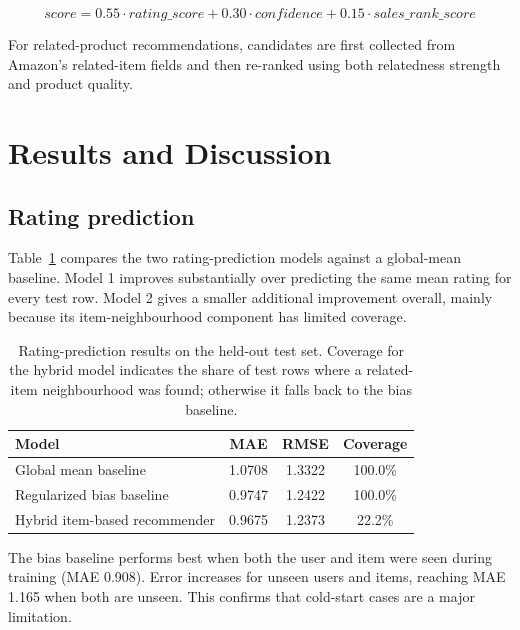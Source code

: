 \documentclass[11pt,a4paper]{article}
\begin{document}
\[
score = 0.55 \cdot rating\_score + 0.30 \cdot confidence + 0.15 \cdot sales\_rank\_score
\]

For related-product recommendations, candidates are first collected from Amazon's related-item fields and then re-ranked using both relatedness strength and product quality.
 
\section{Results and Discussion}
\label{sec:results}
 
\subsection{Rating prediction}

Table~\ref{tab:model_results} compares the two rating-prediction models against a global-mean baseline. Model 1 improves substantially over predicting the same mean rating for every test row. Model 2 gives a smaller additional improvement overall, mainly because its item-neighbourhood component has limited coverage.

\begin{table}[h]
\centering
\small
\begin{tabular}{@{}lccc@{}}
\toprule
\textbf{Model} & \textbf{MAE} & \textbf{RMSE} & \textbf{Coverage} \\
\midrule
Global mean baseline & 1.0708 & 1.3322 & 100.0\% \\
Regularized bias baseline & 0.9747 & 1.2422 & 100.0\% \\
Hybrid item-based recommender & 0.9675 & 1.2373 & 22.2\% \\
\bottomrule
\end{tabular}
\caption{Rating-prediction results on the held-out test set. Coverage for the hybrid model indicates the share of test rows where a related-item neighbourhood was found; otherwise it falls back to the bias baseline.}
\label{tab:model_results}
\end{table}

The bias baseline performs best when both the user and item were seen during training (MAE 0.908). Error increases for unseen users and items, reaching MAE 1.165 when both are unseen. This confirms that cold-start cases are a major limitation.
\end{document}
